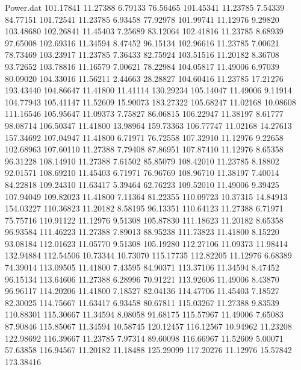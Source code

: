 \begin{filecontents}{Power.dat}
 101.17841   11.27388    6.79133   76.56465
 101.45341   11.23785    7.54339   84.77151
 101.72541   11.23785    6.93458   77.92978
 101.99741   11.12976    9.29820  103.48680
 102.26841   11.45403    7.25689   83.12064
 102.41816   11.23785    8.68939   97.65008
 102.69316   11.34594    8.47452   96.15134
 102.96616   11.23785    7.00621   78.73469
 103.23917   11.23785    7.36433   82.75924
 103.51516   11.20182    8.36708   93.72652
 103.78816   11.16579    7.00621   78.22984
 104.05817   11.49006    6.97039   80.09020
 104.33016   11.56211    2.44663   28.28827
 104.60416   11.23785   17.21276  193.43440
 104.86647   11.41800   11.41114  130.29234
 105.14047   11.49006    9.11914  104.77943
 105.41147   11.52609   15.90073  183.27322
 105.68247   11.02168   10.08608  111.16546
 105.95647   11.09373    7.75827   86.06815
 106.22947   11.38197    8.61777   98.08714
 106.50347   11.41800   13.98964  159.73363
 106.77747   11.02168   14.27613  157.34692
 107.04947   11.41800    6.71971   76.72558
 107.32910   11.12976    9.22658  102.68963
 107.60110   11.27388    7.79408   87.86951
 107.87410   11.12976    8.65358   96.31228
 108.14910   11.27388    7.61502   85.85079
 108.42010   11.23785    8.18802   92.01571
 108.69210   11.45403    6.71971   76.96769
 108.96710   11.38197    7.40014   84.22818
 109.24310   11.63417    5.39464   62.76223
 109.52010   11.49006    9.39425  107.94049
 109.82023   11.41800    7.11364   81.22355
 110.09723   10.37315   14.84913  154.03227
 110.36823   11.20182    8.58195   96.13351
 110.64123   11.27388    6.71971   75.75716
 110.91122   11.12976    9.51308  105.87830
 111.18623   11.20182    8.65358   96.93584
 111.46223   11.27388    7.89013   88.95238
 111.73823   11.41800    8.15220   93.08184
 112.01623   11.05770    9.51308  105.19280
 112.27106   11.09373   11.98414  132.94884
 112.54506   10.73344   10.73070  115.17735
 112.82205   11.12976    6.68389   74.39014
 113.09505   11.41800    7.43595   84.90371
 113.37106   11.34594    8.47452   96.15134
 113.64606   11.27388    6.28996   70.91221
 113.92606   11.49006    8.43870   96.96117
 114.20206   11.41800    7.18527   82.04136
 114.47706   11.45403    7.18527   82.30025
 114.75667   11.63417    6.93458   80.67811
 115.03267   11.27388    9.83539  110.88301
 115.30667   11.34594    8.08058   91.68175
 115.57967   11.49006    7.65083   87.90846
 115.85067   11.34594   10.58745  120.12457
 116.12567   10.94962   11.23208  122.98692
 116.39667   11.23785    7.97314   89.60098
 116.66967   11.52609    5.00071   57.63858
 116.94567   11.20182   11.18488  125.29099
 117.20276   11.12976   15.57842  173.38416

\end{filecontents}
